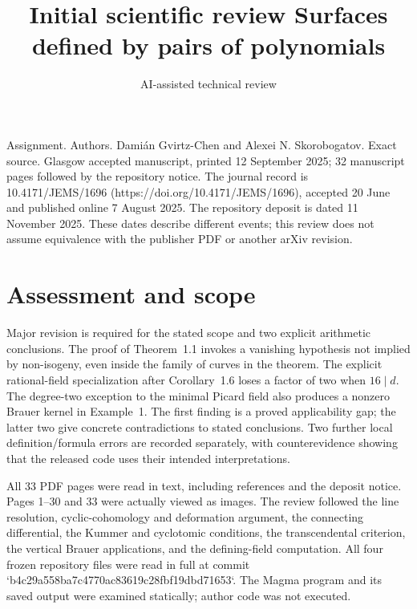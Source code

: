 \documentclass[10pt]{article}
\title{Initial scientific review
Surfaces defined by pairs of polynomials}
\author{AI-assisted technical review}
\date{}
\begin{document}
\maketitle
Assignment. Authors. Damián Gvirtz-Chen and Alexei N. Skorobogatov. Exact source. Glasgow accepted manuscript, printed 12 September 2025; 32 manuscript pages followed by the repository notice. The journal record is 10.4171/JEMS/1696 (https://doi.org/10.4171/JEMS/1696), accepted 20 June and published online 7 August 2025. The repository deposit is dated 11 November 2025. These dates describe different events; this review does not assume equivalence with the publisher PDF or another arXiv revision.\par
\section*{Assessment and scope}
Major revision is required for the stated scope and two explicit arithmetic conclusions. The proof of Theorem 1.1 invokes a vanishing hypothesis not implied by non-isogeny, even inside the family of curves in the theorem. The explicit rational-field specialization after Corollary 1.6 loses a factor of two when \(16\mid d\). The degree-two exception to the minimal Picard field also produces a nonzero Brauer kernel in Example 1. The first finding is a proved applicability gap; the latter two give concrete contradictions to stated conclusions. Two further local definition/formula errors are recorded separately, with counterevidence showing that the released code uses their intended interpretations.\par
All 33 PDF pages were read in text, including references and the deposit notice. Pages 1–30 and 33 were actually viewed as images. The review followed the line resolution, cyclic-cohomology and deformation argument, the connecting differential, the Kummer and cyclotomic conditions, the transcendental criterion, the vertical Brauer applications, and the defining-field computation. All four frozen repository files were read in full at commit `b4c29a558ba7c4770ac83619c28fbf19dbd71653`. The Magma program and its saved output were examined statically; author code was not executed.\par
\end{document}
